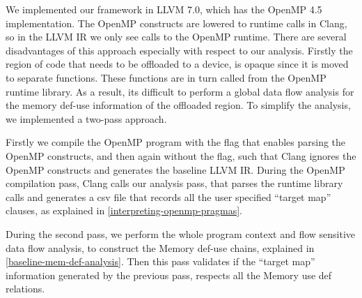 We implemented our framework in LLVM 7.0, which has the OpenMP 4.5 implementation. 
The OpenMP constructs are lowered to runtime calls in Clang, so 
in the LLVM IR we only see calls to the OpenMP runtime. 
There are several disadvantages of this approach especially with respect to our analysis. 
Firstly the region of code that needs to be offloaded to a device, 
is opaque since it is moved to separate functions. 
These functions are in turn called from the OpenMP runtime library. 
As a result, its difficult to perform a global data flow analysis 
for the memory def-use information of the offloaded region. 
To simplify the analysis, we implemented a two-pass approach. 

Firstly we compile the OpenMP program with the flag that enables
parsing the OpenMP constructs, and then again without the flag, 
such that Clang ignores the OpenMP constructs and generates the 
baseline LLVM IR. During the OpenMP compilation pass, Clang 
calls our analysis pass, that parses the runtime library calls 
and generates a csv file that records all the user specified 
``target map'' clauses, as explained in \autoref{interpreting-openmp-pragmas}.

During the second pass, 
we perform the whole program context and flow sensitive data flow analysis, to construct
the Memory def-use chains, explained in 
\autoref{baseline-mem-def-analysis}.
Then this pass validates if the ``target map''
information generated by the previous pass, respects all the Memory 
use def relations.
